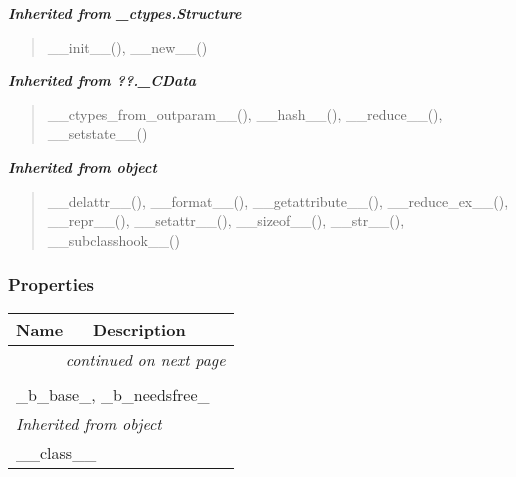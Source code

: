 \large{\textbf{\textit{Inherited from \_ctypes.Structure}}}

\begin{quote}
\_\_init\_\_(), \_\_new\_\_()
\end{quote}

\large{\textbf{\textit{Inherited from ??.\_CData}}}

\begin{quote}
\_\_ctypes\_from\_outparam\_\_(), \_\_hash\_\_(), \_\_reduce\_\_(), \_\_setstate\_\_()
\end{quote}

\large{\textbf{\textit{Inherited from object}}}

\begin{quote}
\_\_delattr\_\_(), \_\_format\_\_(), \_\_getattribute\_\_(), \_\_reduce\_ex\_\_(), \_\_repr\_\_(), \_\_setattr\_\_(), \_\_sizeof\_\_(), \_\_str\_\_(), \_\_subclasshook\_\_()
\end{quote}


  \subsubsection{Properties}

    \vspace{-1cm}
\hspace{\varindent}\begin{longtable}{|p{\varnamewidth}|p{\vardescrwidth}|l}
\cline{1-2}
\cline{1-2} \centering \textbf{Name} & \centering \textbf{Description}& \\
\cline{1-2}
\endhead\cline{1-2}\multicolumn{3}{r}{\small\textit{continued on next page}}\\\endfoot\cline{1-2}
\endlastfoot\multicolumn{2}{|l|}{\textit{Inherited from ??.\_CData}}\\
\multicolumn{2}{|p{\varwidth}|}{\raggedright \_b\_base\_, \_b\_needsfree\_}\\
\cline{1-2}
\multicolumn{2}{|l|}{\textit{Inherited from object}}\\
\multicolumn{2}{|p{\varwidth}|}{\raggedright \_\_class\_\_}\\
\cline{1-2}
\end{longtable}



